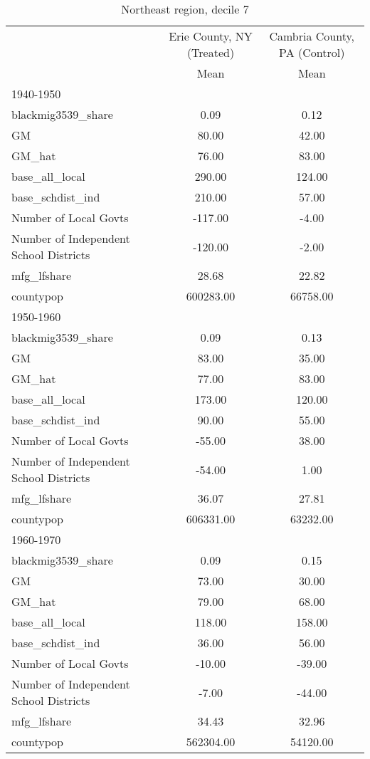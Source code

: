 \begin{table}[htbp]\centering
\def\sym#1{\ifmmode^{#1}\else\(^{#1}\)\fi}
\caption{Northeast region, decile 7 \label{tab1}}
\begin{tabular}{l*{2}{c}}
\toprule
                    &\multicolumn{1}{c}{Erie County, NY (Treated)}&\multicolumn{1}{c}{Cambria County, PA (Control)}\\
                    &        Mean&        Mean\\
\midrule
1940-1950           &            &            \\
blackmig3539\_share  &        0.09&        0.12\\
GM                  &       80.00&       42.00\\
GM\_hat              &       76.00&       83.00\\
base\_all\_local      &      290.00&      124.00\\
base\_schdist\_ind    &      210.00&       57.00\\
Number of Local Govts&     -117.00&       -4.00\\
Number of Independent School Districts&     -120.00&       -2.00\\
mfg\_lfshare         &       28.68&       22.82\\
countypop           &   600283.00&    66758.00\\
\midrule
1950-1960           &            &            \\
blackmig3539\_share  &        0.09&        0.13\\
GM                  &       83.00&       35.00\\
GM\_hat              &       77.00&       83.00\\
base\_all\_local      &      173.00&      120.00\\
base\_schdist\_ind    &       90.00&       55.00\\
Number of Local Govts&      -55.00&       38.00\\
Number of Independent School Districts&      -54.00&        1.00\\
mfg\_lfshare         &       36.07&       27.81\\
countypop           &   606331.00&    63232.00\\
\midrule
1960-1970           &            &            \\
blackmig3539\_share  &        0.09&        0.15\\
GM                  &       73.00&       30.00\\
GM\_hat              &       79.00&       68.00\\
base\_all\_local      &      118.00&      158.00\\
base\_schdist\_ind    &       36.00&       56.00\\
Number of Local Govts&      -10.00&      -39.00\\
Number of Independent School Districts&       -7.00&      -44.00\\
mfg\_lfshare         &       34.43&       32.96\\
countypop           &   562304.00&    54120.00\\
\bottomrule
\end{tabular}
\end{table}
